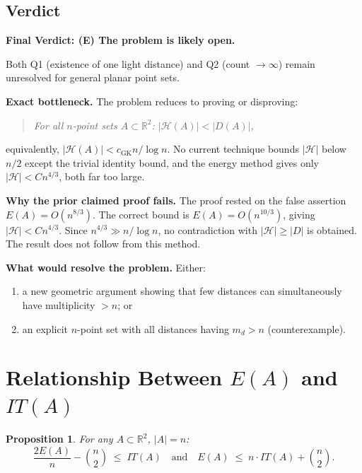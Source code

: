 \documentclass[12pt,a4paper]{amsart}
\theoremstyle{plain}
\newtheorem{proposition}[theorem]{Proposition}
\theoremstyle{definition}
\newcommand{\R}{\mathbb{R}}
\newcommand{\abs}[1]{\left\lvert #1 \right\rvert}
\newcommand{\cH}{\mathcal{H}}
\begin{document}
\subsection{Verdict}

\begin{mdframed}[style=warning]
\textbf{Final Verdict: (E) The problem is likely open.}

\medskip
Both Q1 (existence of one light distance) and Q2 (count $\to\infty$)
remain unresolved for general planar point sets.

\medskip
\noindent\textbf{Exact bottleneck.}
The problem reduces to proving or disproving:
\begin{quote}
\emph{For all $n$-point sets $A \subset \R^2$:
$\abs{\cH(A)} < \abs{D(A)}$,}
\end{quote}
equivalently, $\abs{\cH(A)} < c_{\mathrm{GK}} n/\log n$.
No current technique bounds $\abs{\cH}$ below $n/2$ except the
trivial identity bound, and the energy method gives only $\abs{\cH}
< Cn^{4/3}$, both far too large.

\medskip
\noindent\textbf{Why the prior claimed proof fails.}
The proof rested on the false assertion $E(A) = O(n^{8/3})$.
The correct bound is $E(A) = O(n^{10/3})$, giving $\abs{\cH} < Cn^{4/3}$.
Since $n^{4/3} \gg n/\log n$, no contradiction with $\abs{\cH} \ge \abs{D}$
is obtained.  The result does not follow from this method.

\medskip
\noindent\textbf{What would resolve the problem.}
Either:
\begin{enumerate}[label=(\alph*)]
  \item a new geometric argument showing that few distances can
        simultaneously have multiplicity $> n$; or
  \item an explicit $n$-point set with all distances having $m_d > n$
        (counterexample).
\end{enumerate}
\end{mdframed}

\appendix

\section{Relationship Between $E(A)$ and $IT(A)$}
\label{app:EIT}

\begin{proposition}
\label{prop:EIT_bounds}
For any $A \subset \R^2$, $\abs{A} = n$:
\[
  \frac{2E(A)}{n} - \binom{n}{2} \;\le\; IT(A)
  \quad\text{and}\quad
  E(A) \;\le\; n \cdot IT(A) + \binom{n}{2}.
\]
\end{proposition}
\end{document}
